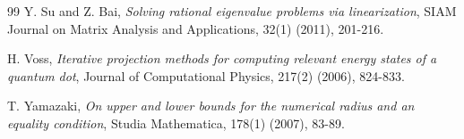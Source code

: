 \documentclass[12pt, reqno]{amsart}
\theoremstyle{definition}
\theoremstyle{remark}
\numberwithin{equation}{section}
\begin{document}
\begin{thebibliography}{99}
Y. Su and Z. Bai, \emph{Solving rational eigenvalue problems via linearization}, SIAM 
Journal on Matrix Analysis and Applications, 32(1) (2011), 201-216.	

H. Voss, \emph{Iterative projection methods for computing relevant energy states of a 
quantum dot}, Journal of Computational Physics, 217(2) (2006), 824-833.

T. Yamazaki, \emph{On upper and lower bounds for the numerical radius and an
equality condition}, Studia Mathematica, 178(1) (2007), 83-89.
       
\end{thebibliography}
\end{document}
